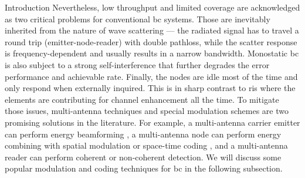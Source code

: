 \begin{section}{}
\begin{subsection}{Introduction}
		Nevertheless, low throughput and limited coverage are acknowledged as two critical problems for conventional \gls{bc} systems.
		Those are inevitably inherited from the nature of wave scattering --- the radiated signal has to travel a round trip (emitter-node-reader) with double pathloss, while the scatter response is frequency-dependent and usually results in a narrow bandwidth.
		Monostatic \gls{bc} is also subject to a strong self-interference that further degrades the error performance and achievable rate.
		Finally, the nodes are idle most of the time and only respond when externally inquired.
		This is in sharp contrast to \gls{ris} where the elements are contributing for channel enhancement all the time.
		To mitigate those issues, multi-antenna techniques and special modulation schemes are two promising solutions in the literature.
		For example, a multi-antenna carrier emitter can perform energy beamforming \cite{Yang2015b}, a multi-antenna node can perform energy combining with spatial modulation \cite{Chen2020,Goudeli2020} or space-time coding \cite{Liu2021a}, and a multi-antenna reader can perform coherent \cite{He2020d,Wang2021b} or non-coherent \cite{Devineni2021} detection.
		We will discuss some popular modulation and coding techniques for \gls{bc} in the following subsection.
	\end{subsection}


\end{section}
